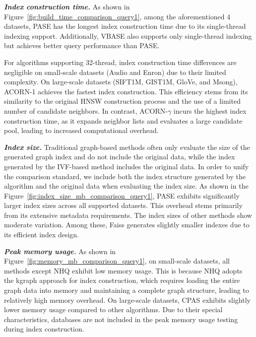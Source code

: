 \documentclass[sigconf, nonacm]{acmart}
\begin{document}
	\textit{\textbf{Index construction time.}}
	As shown in Figure~\ref{fig:build_time_comparison_query1}, among the aforementioned 4 datasets, PASE has the longest index construction time due to its single-thread indexing support. Additionally, VBASE also supports only single-thread indexing but achieves better query performance than PASE.
	
	For algorithms supporting 32-thread, index construction time differences are negligible on small-scale datasets (Audio and Enron) due to their limited complexity. On large-scale datasets (SIFT1M, GIST1M, GloVe, and Msong), ACORN-1 achieves the fastest index construction. This efficiency stems from its similarity to the original HNSW construction process and the use of a limited number of candidate neighbors. In contrast, ACORN-$\gamma$ incurs the highest index construction time, as it expands neighbor lists and evaluates a large candidate pool, leading to increased computational overhead.
	
	
	\textit{\textbf{Index size.}}
	Traditional graph-based methods often only evaluate the size of the generated graph index and do not include the original data, while the index generated by the IVF-based method includes the original data. In order to unify the comparison standard, 
	we include both the index structure generated by the algorithm and the original data when evaluating the index size. 
	As shown in the Figure~\ref{fig:index_size_mb_comparison_query1}, PASE exhibits significantly larger index sizes across all supported datasets. This overhead stems primarily from its extensive metadata requirements. The index sizes of other methods show moderate variation. Among these, Faiss generates slightly smaller indexes due to its efficient index design.
	
	
	
	\textit{\textbf{Peak memory usage.}}
	As shown in Figure~\ref{fig:memory_mb_comparison_query1}, on small-scale datasets, all methods except NHQ exhibit low memory usage. This is because NHQ adopts the kgraph approach for index construction, which requires loading the entire graph data into memory and maintaining a complete graph structure, leading to relatively high memory overhead. On large-scale datasets, CPAS exhibits slightly lower memory usage compared to other algorithms. Due to their special characteristics, databases are not included in the peak memory usage testing during index construction.
	
\end{document}
